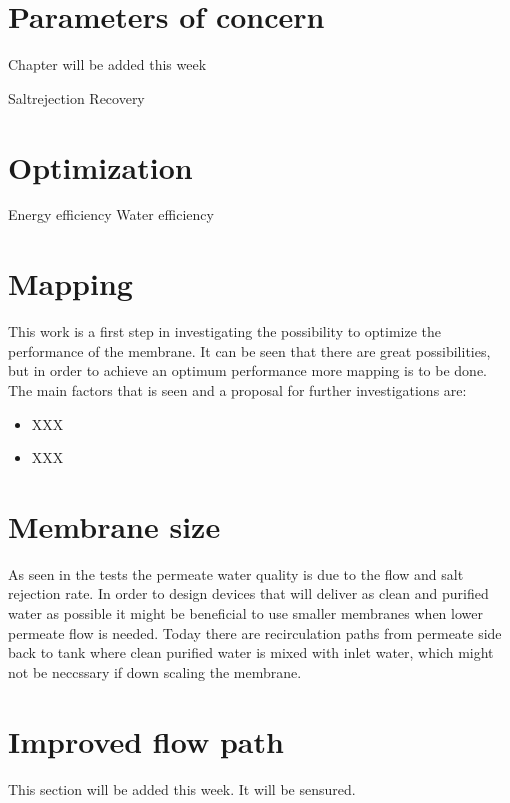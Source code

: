 
\section{Parameters of concern}

Chapter will be added this week


Saltrejection
Recovery


\section{Optimization}

Energy efficiency
Water efficiency



\section{Mapping}
This work is a first step in investigating the possibility to optimize the performance of the membrane. It can be seen that there are great possibilities, but in order to achieve an optimum performance more mapping is to be done. The main factors that is seen and a proposal for further investigations are:

\begin{itemize}
\item XXX
\item XXX
\end{itemize}


\section{Membrane size}
As seen in the tests the permeate water quality is due to the flow and salt rejection rate. In order to design devices that will deliver as clean and purified water as possible it might be beneficial to use smaller membranes when lower permeate flow is needed. Today there are recirculation paths from permeate side back to tank where clean purified water is mixed with inlet water, which might not be neccssary if down scaling the membrane.


\section{Improved flow path}

This section will be added this week. It will be sensured.








